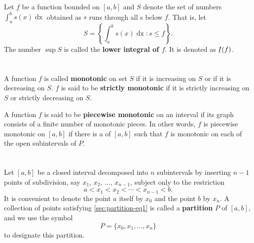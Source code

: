 \documentclass{report}
\begin{document}
\section{}%
\label{ref:lower-integral}

Let $f$ be a function bounded on $[a, b]$ and $S$ denote the set of numbers
  $\int_a^b s(x) \mathop{dx}$ obtained as $s$ runs through all
  s below $f$.
That is, let $$S = \left\{ \int_a^b s(x) \mathop{dx} : s \leq f \right\}.$$
The number $\sup{S}$ is called the \textbf{lower integral of $f$}.
It is denoted as $\ubar{I}(f)$.

\section{}%
\label{ref:monotonic}

A function $f$ is called \textbf{monotonic} on set $S$ if it is increasing on
  $S$ or if it is decreasing on $S$.
$f$ is said to be \textbf{strictly monotonic} if it is strictly increasing on
  $S$ or strictly decreasing on $S$.

A function $f$ is said to be \textbf{piecewise monotonic} on an interval if its
  graph consists of a finite number of monotonic pieces.
In other words, $f$ is piecewise monotonic on $[a, b]$ if there is a
   of $[a, b]$ such that $f$ is monotonic on each of
  the open subintervals of $P$.

\section{}%
\label{ref:partition}

Let $[a, b]$ be a closed interval decomposed into $n$ subintervals by inserting
  $n - 1$ points of subdivision, say $x_1$, $x_2$, $\ldots$, $x_{n-1}$, subject
  only to the restriction
  \begin{equation}
    \label{sec:partition-eq1}
    a < x_1 < x_2 < \cdots < x_{n-1} < b.
  \end{equation}
It is convenient to denote the point $a$ itself by $x_0$ and the point $b$ by
  $x_n$.
A collection of points satisfying \eqref{sec:partition-eq1} is called a
  \textbf{partition} $P$ of $[a, b]$, and we use the symbol
  $$P = \{x_0, x_1, \ldots, x_n\}$$ to designate this partition.

\begin{definition}


\end{definition}
\end{document}
